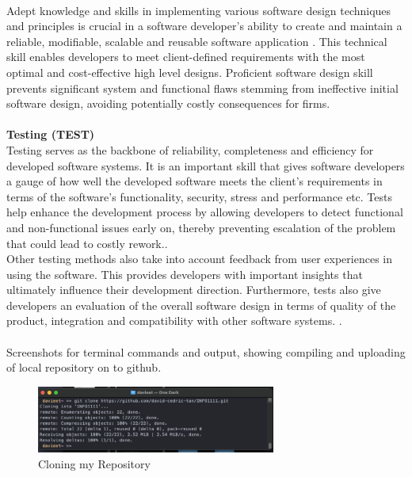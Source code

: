 \documentclass[a4paper, 11pt]{report}
\begin{document}
\\[1em]
 Adept knowledge and skills in implementing various software design techniques and principles is crucial in a software developer’s ability to create and maintain a reliable, modifiable, scalable and reusable software application \cite{SWDN1}\cite{SWDN2}. This technical skill enables developers to meet client-defined requirements with the most optimal and cost-effective high level designs. Proficient software design skill prevents significant system and functional flaws stemming from ineffective initial software design, avoiding potentially costly consequences for firms.\cite{SWDN1}
\\[1em]
\\[1em]
\noindent \textbf {Testing (TEST)}
\\[1em]
Testing serves as the backbone of reliability, completeness and efficiency for developed software systems. It is an important skill that gives software developers a gauge of how well the developed software meets the client’s requirements in terms of the software’s functionality, security, stress and performance etc.\cite{TEST1}  Tests help enhance the development process by allowing developers to detect functional and non-functional issues early on, thereby preventing escalation of the problem that could lead to costly rework.\cite{TEST2}\cite{TEST3}.
\\[1em]
Other testing methods also take into account feedback from user experiences in using the software. This provides developers with important insights that ultimately influence their development direction. Furthermore, tests also give developers an evaluation of the overall software design in terms of quality of the product, integration and compatibility with other software systems.
\cite{TEST2}.
\\[1em]
\\[1em]

Screenshots for terminal commands and output, showing compiling and uploading of local repository on to github. 


\begin{figure}[H]
    \centering
    \includegraphics[width=0.7\textwidth]{selfrepo}
    \caption{Cloning my Repository}
\end{figure}
\end{document}
